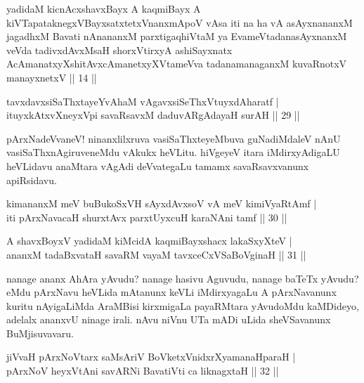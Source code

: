 \begin{shl}
yadidaM kicnAcxshavxBayx A kaqmiBayx A kiVTapataknegxVBayxsatxtetxV\s nanxmApoV vAsa iti na ha vA asAyxnananxM jagadhxM Bavati nAnananxM parxtigaqhiVtaM ya EvameVtadanasAyxnanxM veVda tadivxdAvxMsaH shorxVtirxyA ashiSayxnatx AcAmanatxyXshitAvxcAmanetxyXVtameVva tadanamanaganxM kuvaRnotxV manayxnetxV || 14 ||
\end{shl}

\begin{shl}
tavxdavxsiSaThxtayeYvAhaM vAgavxsiSeThxVtuyxdAharatf | \\
ituyxkAtxvX\s neyxV\s pi savaRsavxM daduvARgAdayaH surAH \hfill|| 29 || 
\end{shl}

\begin{artha}
pArxNadeVvaneV! ninanxlilxruva vasiSaThxteyeMbuva guNadiMdaleV nAnU 
vasiSaThxnAgiruveneMdu vAkukx heVLitu. hiVgeyeV itara iMdirxyAdigaLU 
heVLidavu anaMtara vAgAdi deVvategaLu tamamx savaRsavxvanunx apiRsidavu.
\end{artha}


\begin{shl}
kimananxM meV buBukoSxVH sAyxdAvxsoV vA meV kimiVyaRtAmf | \\
iti pArxNavacaH shurxtAvx parxtUyxcuH karaNAni tamf \hfill|| 30 || 
\end{shl}

\begin{shl}
A shavxBoyxV yadidaM kiMcidA kaqmiBayxshacx lakaSxyXteV | \\
ananxM tadaBxvataH savaRM vayaM tavxceCxVSaBoVginaH \hfill|| 31 || 
\end{shl}

\begin{artha}
nanage ananx AhAra yAvudu? nanage hasivu Aguvudu, nanage baTeTx 
yAvudu? eMdu pArxNavu heVLida mAtanunx keVLi iMdirxyagaLu A 
pArxNavanunx kuritu nAyigaLiMda AraMBisi kirxmigaLa payaRMtara 
yAvudoMdu kaMDideyo, adelalx ananxvU ninage irali. nAvu niVnu UTa mADi 
uLida sheVSavanunx BuMjisuvavaru.
\end{artha}


\begin{shl}
jiVvaH pArxNoV\s tarx saMsAriV BoVketxVnidxrXyamanaHparaH | \\
\footnotemark[1]pArxNoV heyxVtAni savARNi BavatiVti ca liknagxtaH \hfill|| 32 || 
\end{shl}

